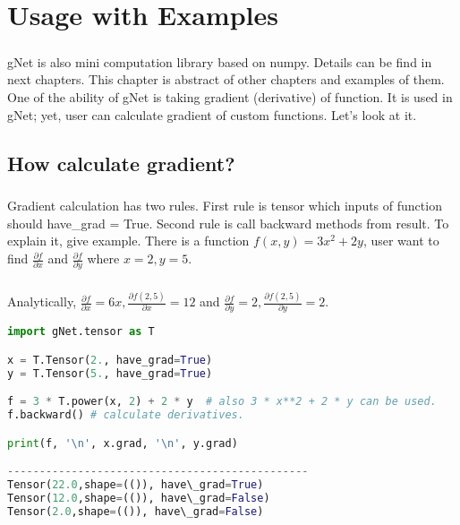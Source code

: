 \documentclass[12pt]{report}
\begin{document}
\chapter{Usage with Examples}

\paragraph{}
gNet is also mini computation library based on numpy. Details can be find in next chapters. This chapter is abstract of other chapters and examples of them. One of the ability of gNet is taking gradient (derivative) of function. It is used in gNet; yet, user can calculate gradient of custom functions. Let's look at it.

\section{How calculate gradient?}
\paragraph{}
Gradient calculation has two rules. First rule is tensor which inputs of function should have\_grad = True. Second rule is call backward methods from result. To explain it, give example. There is a function $f(x,y) = 3x^2 + 2y$, user want to find $\frac{\partial f}{\partial x}$ and $\frac{\partial f}{\partial y}$ where $x=2, y=5$. 

\paragraph{}
Analytically, $\frac{\partial f}{\partial x} = 6x, \frac{\partial f(2,5)}{\partial x} = 12$ and  $\frac{\partial f}{\partial y} = 2, \frac{\partial f(2,5)}{\partial y} = 2$. 

\begin{lstlisting}[language=Python, numbers=none, caption={Calculation of gradient.}, label={ex:grad-calc}]
import gNet.tensor as T

x = T.Tensor(2., have_grad=True)
y = T.Tensor(5., have_grad=True)

f = 3 * T.power(x, 2) + 2 * y  # also 3 * x**2 + 2 * y can be used.
f.backward() # calculate derivatives. 

print(f, '\n', x.grad, '\n', y.grad)

-----------------------------------------------
Tensor(22.0,shape=(()), have\_grad=True) 
Tensor(12.0,shape=(()), have\_grad=False)
Tensor(2.0,shape=(()), have\_grad=False)
\end{lstlisting}
\end{document}
